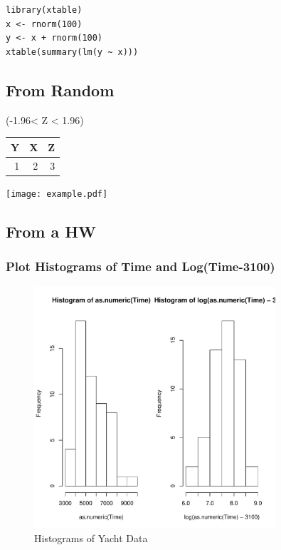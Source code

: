 \documentclass[11pt]{article}
\begin{document}
\begin{verbatim}
library(xtable)
x <- rnorm(100)
y <- x + rnorm(100)
xtable(summary(lm(y ~ x)))
\end{verbatim}
\subsection{From Random}
\label{sec-1-2}

(-1.96< Z < 1.96)


\begin{center}
\begin{tabular}{rrr}
 Y  &  X  &  Z  \\
\hline
 1  &  2  &  3  \\
\end{tabular}
\end{center}





\texttt{[image: example.pdf]}
\subsection{From a HW}
\label{sec-1-3}
\subsubsection{Plot Histograms of Time and Log(Time-3100)}
\label{sec-1-3-1}



\begin{figure}[p]
\centering
\includegraphics[width=0.8\textwidth,]{prob2a.pdf}
\caption{\label{fig:histograms}Histograms of Yacht Data}
\end{figure}
\end{document}
